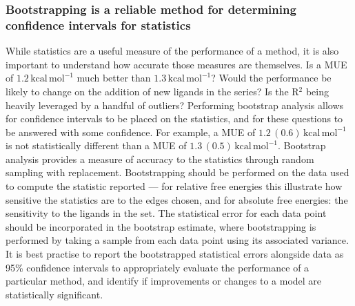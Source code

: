 \documentclass[9pt,bestpractices]{livecoms}
\begin{document}
\subsubsection{Bootstrapping is a reliable method for determining confidence intervals for statistics}

While statistics are a useful measure of the performance of a method, it is also important to understand how accurate those measures are themselves. Is a MUE of $1.2\,\mathrm{kcal\,mol^{-1}}$ much better than $1.3\,\mathrm{kcal\,mol^{-1}}$? Would the performance be likely to change on the addition of new ligands in the series? Is the R$^2$ being heavily leveraged by a handful of outliers? Performing bootstrap analysis allows for confidence intervals to be placed on the statistics, and for these questions to be answered with some confidence. For example, a MUE of $1.2\,(0.6)\,\mathrm{kcal\,mol^{-1}}$ is not statistically different than a MUE of $1.3\,(0.5)\,\mathrm{kcal\,mol^{-1}}$. Bootstrap analysis provides a measure of accuracy to the statistics through random sampling with replacement. Bootstrapping should be performed on the data used to compute the statistic reported --- for relative free energies this illustrate how sensitive the statistics are to the edges chosen, and for absolute free energies: the sensitivity to the ligands in the set. The statistical error for each data point should be incorporated in the bootstrap estimate, where bootstrapping is performed by taking a sample from each data point using its associated variance. It is best practise to report the bootstrapped statistical errors alongside data as 95\% confidence intervals to appropriately evaluate the performance of a particular method, and identify if improvements or changes to a model are statistically significant.


\end{document}
